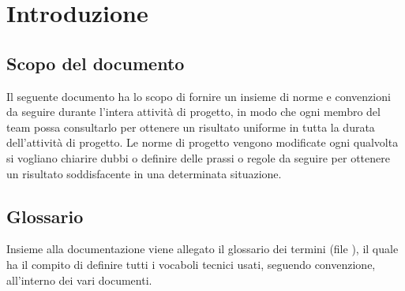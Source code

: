 \section{Introduzione}{
	\subsection{Scopo del documento}{
		Il seguente documento ha lo scopo di fornire un insieme di norme e convenzioni da seguire durante l’intera attività di progetto, in modo che ogni membro del team possa consultarlo per ottenere un risultato uniforme in tutta la durata dell’attività di progetto. Le norme di progetto vengono modificate ogni qualvolta si vogliano chiarire dubbi o definire delle prassi o regole da seguire per ottenere un risultato soddisfacente in una determinata situazione.
	 }
	\subsection{Glossario}{ 
	Insieme alla documentazione viene allegato il glossario dei termini (file  \href{../../Glossario/\Glossario}{\GlossarioEscape}), il quale ha il compito di definire tutti i vocaboli tecnici usati, seguendo convenzione, all’interno dei vari documenti.	}
}